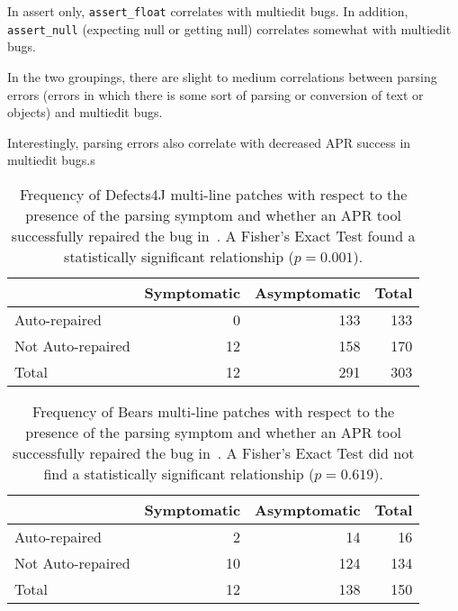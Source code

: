 In assert only, \lstinline{assert_float} correlates with multiedit bugs. In addition, \lstinline{assert_null} (expecting null or getting null) correlates somewhat with multiedit bugs.

In the two groupings, there are slight to medium correlations between parsing errors (errors in which there is some sort of parsing or conversion of text or objects) and multiedit bugs.

Interestingly, parsing errors also correlate with decreased APR success in multiedit bugs.s

\begin{table}
{\begin{center}
	\begin{tabular}{l | rr | r}
            	\toprule
            	& Symptomatic & Asymptomatic & Total \\
            	\midrule
            	Auto-repaired & 0 & 133 & 133 \\
            	Not Auto-repaired & 12 & 158 & 170 \\
            	\midrule
            	Total & 12 & 291 & 303\\
            	\bottomrule
	\end{tabular}
 \end{center}
}
	\caption{Frequency of Defects4J multi-line patches with respect to the presence of
	the parsing symptom and whether an APR tool successfully
	repaired the bug in~\cite{durieux-repair-them-all}.
	A Fisher's Exact Test found a statistically significant relationship
	($p = 0.001$).}
	\label{tab:parsing-repair-frequencies-d4j}
\end{table}

\begin{table}
{\begin{center}
	\begin{tabular}{l | rr | r}
            	\toprule
            	& Symptomatic & Asymptomatic & Total \\
            	\midrule
            	Auto-repaired & 2 & 14 & 16 \\
            	Not Auto-repaired & 10 & 124 & 134 \\
            	\midrule
            	Total & 12 & 138 & 150\\
            	\bottomrule
	\end{tabular}
 \end{center}
}
	\caption{Frequency of Bears multi-line patches with respect to the presence of
	the parsing symptom and whether an APR tool successfully
	repaired the bug in~\cite{durieux-repair-them-all}.
	A Fisher's Exact Test did not find a statistically significant relationship
	($p = 0.619$).}
	\label{tab:parsing-repair-frequencies-bears}
\end{table}

